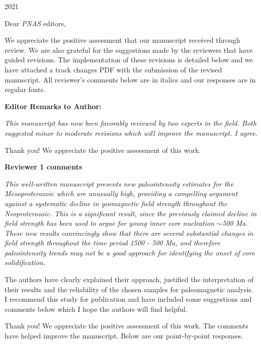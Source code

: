 \documentclass[11pt, letterpaper]{article}
\begin{document}
\begin{flushleft}
 
\hfill 2021

Dear \textit{PNAS} editors,

We appreciate the positive assessment that our manuscript received through review. We are also grateful for the suggestions made by the reviewers that have guided revisions. The implementation of these revisions is detailed below and we have attached a track changes PDF with the submission of the revised manuscript. All reviewer's comments below are in italics and our responses are in regular fonts. 
 
 \textbf{\Large Editor Remarks to Author:}

\textit{This manuscript has now been favorably reviewed by two experts in the field. Both suggested minor to moderate revisions which will improve the manuscript. I agree.}

Thank you! We appreciate the positive assessment of this work.

\textbf{\Large Reviewer 1 comments}

\itshape
This well-written manuscript presents new paleointensity estimates for the Mesoproterozoic which are unusually high, providing a compelling argument against a systematic decline in geomagnetic field strength throughout the Neoproterozoic. This is a significant result, since the previously claimed decline in field strength has been used to argue for young inner core nucleation $\sim$500 Ma. These new results convincingly show that there are several substantial changes in field strength throughout the time period 1500 - 500 Ma, and therefore paleointensity trends may not be a good approach for identifying the onset of core solidification.

The authors have clearly explained their approach, justified the interpretation of their results and the reliability of the chosen samples for paleomagnetic analysis. I recommend this study for publication and have included some suggestions and comments below which I hope the authors will find helpful.

\upshape 

Thank you! We appreciate the positive assessment of this work. The comments have helped improve the manuscript. Below are our point-by-point responses.


\end{flushleft}
\end{document}
